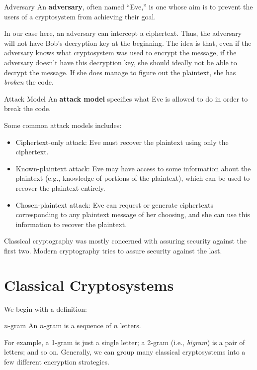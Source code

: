 \documentclass[letterpaper]{article}
\begin{document}
\begin{definition}{Adversary}{}
    An \textbf{adversary}, often named ``Eve,'' is one whose aim is to prevent the users of a cryptosystem from achieving their goal. 
\end{definition}
In our case here, an adversary can intercept a ciphertext. Thus, the adversary will not have Bob's decryption key at the beginning. The idea is that, even if the adversary knows what cryptosystem was used to encrypt the message, if the adversary doesn't have this decryption key, she should ideally not be able to decrypt the message. If she does manage to figure out the plaintext, she has \emph{broken} the code.

\begin{definition}{Attack Model}{}
    An \textbf{attack model} specifies what Eve is allowed to do in order to break the code. 
\end{definition}
Some common attack models includes:
\begin{itemize}
    \item Ciphertext-only attack: Eve must recover the plaintext using only the ciphertext.
    \item Known-plaintext attack: Eve may have access to some information about the plaintext (e.g., knowledge of portions of the plaintext), which can be used to recover the plaintext entirely. 
    \item Chosen-plaintext attack: Eve can request or generate ciphertexts corresponding to any plaintext message of her choosing, and she can use this information to recover the plaintext.
\end{itemize}
Classical cryptography was mostly concerned with assuring security against the first two. Modern cryptography tries to assure security against the last. 


\newpage 
\section{Classical Cryptosystems}
We begin with a definition: 
\begin{definition}{$n$-gram}{}
    An $n$-gram is a sequence of $n$ letters.
\end{definition}
For example, a 1-gram is just a single letter; a 2-gram (i.e., \emph{bigram}) is a pair of letters; and so on. Generally, we can group many classical cryptosystems into a few different encryption strategies.
\end{document}
